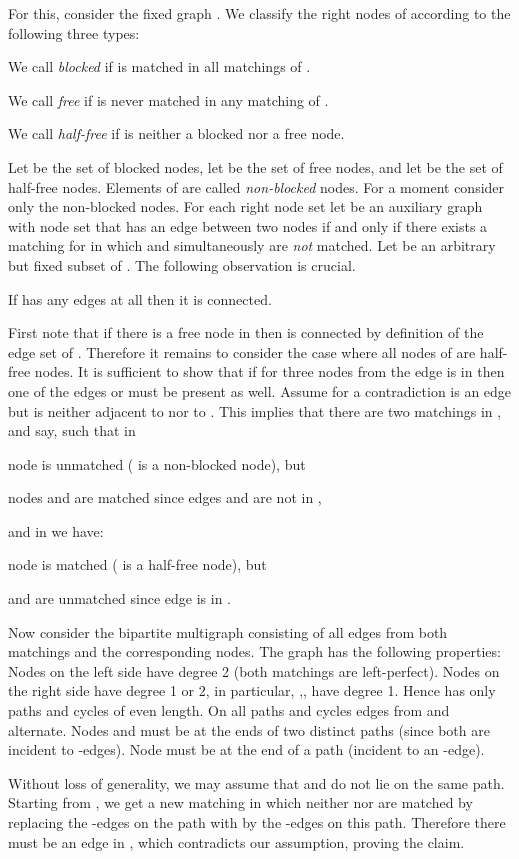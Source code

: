 \let\accentvec\vec \documentclass{llncs}
\newenvironment{proof_claim}{\upshape{\textsc{Proof of Claim.}}} {\hfill\ensuremath{\square}\smallskip}
\begin{document}
For this, consider the fixed graph . We classify the right nodes of  according to the following three types:
\begin{compactitem}
 \item We call  \emph{blocked}   if  is matched in all matchings of .
 \item We call  \emph{free}      if  is never matched in any matching of .
 \item We call  \emph{half-free} if  is neither a blocked nor a free node.
\end{compactitem}
Let  be the set of blocked nodes, let  be the set of free nodes, and let  be the set of half-free nodes.
Elements of  are called \emph{non-blocked} nodes.
For a moment consider only the non-blocked nodes. For each right node set 
let  be an auxiliary graph with node set  that
has an edge between two nodes  if and only if there exists a matching
for  in which  and  simultaneously are \emph{not} matched.
Let  be an arbitrary but fixed subset of . The following observation is crucial.
\begin{myClaim}
\label{claim:H_connected}
If  has any edges at all then it is connected.
\end{myClaim}
\begin{proof_claim}
First note that if there is a free node in  then  is connected by definition of the edge set of .
Therefore it remains to consider the case where all nodes of  are half-free nodes.
It is sufficient to show that if for three nodes  from  the edge 
is in  then one of the edges  or  must be present as well.
Assume for a contradiction  is an edge but  is neither adjacent to  nor to .
This implies that there are two matchings in ,  and  say,
such that in 
\begin{compactitem}
 \item node  is unmatched ( is a non-blocked node), but 
 \item nodes  and  are matched since edges  and  are not in ,
\end{compactitem}
and in  we have:
\begin{compactitem}
 \item node  is matched ( is a half-free node), but
 \item  and  are unmatched since edge  is in .
\end{compactitem}
Now consider the bipartite multigraph  consisting of all edges from both matchings and the corresponding nodes. The graph  has the following properties:
Nodes on the left side have degree 2 (both matchings are left-perfect). Nodes on the right side have degree 1 or 2, in particular, ,, have degree 1. Hence  has only paths and cycles of even length. On all paths and cycles edges from  and  alternate.
Nodes  and  must be at the ends of two distinct paths (since both are incident to -edges). Node  must be at the end of a path (incident to an -edge).

Without loss of generality, we may assume that  and  do not lie on the same path.
Starting from , we get a new matching in which neither  nor  are matched by
replacing the -edges on the path with  by the -edges on this path.
Therefore there must be an edge  in , which contradicts our assumption, proving the claim.
\end{proof_claim}
\end{document}
